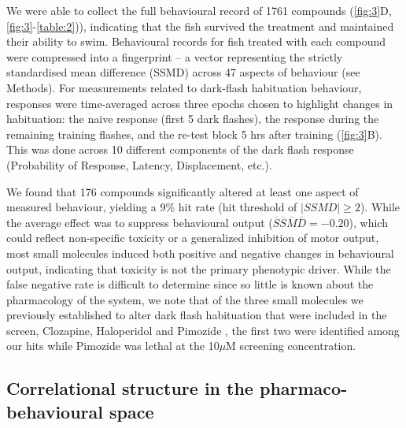\documentclass[9pt,lineno]{RandlettLab_elife}
\begin{document}
We were able to collect the full behavioural record of 1761 compounds  (\autoref{fig:3}D, \autoref{fig:3}-\autoref{table:2})), indicating that the fish survived the treatment and maintained their ability to swim. Behavioural records for fish treated with each compound were compressed into a fingerprint \citep{Rihel2010-pj} -- a vector representing the strictly standardised mean difference (SSMD) across 47 aspects of behaviour (see Methods). For measurements related to dark-flash habituation behaviour, responses were time-averaged across three epochs chosen to highlight changes in habituation: the naive response (first 5 dark flashes), the response during the remaining training flashes, and the re-test block 5 hrs after training (\autoref{fig:3}B). This was done across 10 different components of the dark flash response (Probability of Response, Latency, Displacement, etc.). 

 We found that 176 compounds significantly altered at least one aspect of measured behaviour, yielding a 9\% hit rate (hit threshold of $|SSMD| \geq 2$). While the average effect was to suppress behavioural output (\(\overline S \overline S \overline M \overline D = -0.20\)), which could reflect non-specific toxicity or a generalized inhibition of motor output, most small molecules induced both positive and negative changes in behavioural output, indicating that toxicity is not the primary phenotypic driver. While the false negative rate is difficult to determine since so little is known about the pharmacology of the system, we note that of the three small molecules we previously established to alter dark flash habituation that were included in the screen, Clozapine, Haloperidol and Pimozide \citep{Randlett2019-fi}, the first two were identified among our hits while Pimozide was lethal at the 10$\mu$M screening concentration. 


\subsection{Correlational structure in the pharmaco-behavioural space }
\vspace{3mm}
\end{document}
